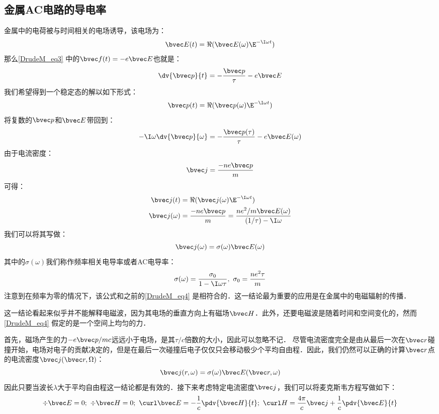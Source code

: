 \subsection{金属AC电路的导电率}
金属中的电荷被与时间相关的电场诱导，该电场为：
\begin{equation}
\bvec E(t)=\Re(\bvec E(\omega)\E^{-\I\omega t})
\end{equation}
那么\autoref{DrudeM_eq3} 中的$\bvec f(t)=-e\bvec E$也就是：
\begin{equation}
\dv{\bvec p}{t}=-\frac{\bvec p}{\tau}-e\bvec E
\end{equation}
我们希望得到一个稳定态的解以如下形式：
\begin{equation}
\bvec p(t)=\Re(\bvec p(\omega)\E^{-\I\omega t})
\end{equation}
将复数的$\bvec p$和$\bvec E$带回到：
\begin{equation}
-\I\omega\dv{\bvec p}{\omega}=-\frac{\bvec p(\tau)}{\tau}-e\bvec E(\omega)
\end{equation}
由于电流密度：
\begin{equation}
\bvec j = \frac{-ne\bvec p}{m}
\end{equation}
可得：
\begin{align}
\bvec j(t)&=\Re(\bvec j(\omega)\E^{-\I\omega t})\\
\bvec j(\omega)&=\frac{-ne\bvec p}{m}=\frac{ne^2/m\bvec E(\omega)}{(1/\tau)-\I\omega}
\end{align}
我们可以将其写做：
\begin{equation}
\bvec j(\omega)=\sigma(\omega)\bvec E(\omega)
\end{equation}
其中的$\sigma(\omega)$我们称作频率相关电导率或者AC电导率：
\begin{equation}
\sigma(\omega)=\frac{\sigma_0}{1-\I\omega\tau},\ \sigma_0=\frac{ne^2\tau}{m}
\end{equation}
注意到在频率为零的情况下，该公式和之前的\autoref{DrudeM_eq4} 是相符合的．这一结论最为重要的应用是在金属中的电磁辐射的传播．

这一结论看起来似乎并不能解释电磁波，因为其电场的垂直方向上有磁场$\bvec H$．此外，还要电磁波是随着时间和空间变化的，然而\autoref{DrudeM_eq4} 假定的是一个空间上均匀的力．

首先，磁场产生的力$-e\bvec p/mc$远远小于电场，是其$\tau/c$倍数的大小，因此可以忽略不记．
尽管电流密度完全是由从最后一次在$\bvec r$碰撞开始，电场对电子的贡献决定的，但是在最后一次碰撞后电子仅仅只会移动极少个平均自由程．因此，我们仍然可以正确的计算$\bvec r$点的电流密度$\bvec j(\bvec r,\Omega)$：
\begin{equation}
\bvec j(r,\omega)=\sigma(\omega)\bvec E(\bvec r,\omega)
\end{equation}
因此只要当波长$\lambda$大于平均自由程这一结论都是有效的．接下来考虑特定电流密度$\bvec j$，我们可以将麦克斯韦方程写做如下：
\begin{equation}
\div \bvec E =0;\ \div \bvec H = 0;\ \curl \bvec E =-\frac{1}{c}\pdv{ \bvec H}{t};\ \curl H = \frac{4\pi}{c}\bvec j+\frac{1}{c}\pdv{ \bvec E}{t}
\end{equation}

